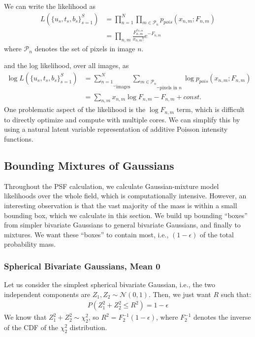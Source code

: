 \documentclass[11pt]{article}
\begin{document}
We can write the likelihood as 
\begin{align}
   L(\{u_s, t_s, b_s\}_{s=1}^S)
     &= \prod_{n=1}^N \prod_{m \in \mathcal{P}_n} p_{pois}(x_{n,m} ; F_{n,m}) \\
     &= \prod_{n,m} \frac{ F_{n,m}^{x_{n,m}}}{x_{n,m}!} e^{-F_{n,m}}
\end{align}
where $\mathcal{P}_n$ denotes the set of pixels in image $n$.  

and the log likelihood, over all images, as 
\begin{align}
  \log L(\{u_s, t_s, b_s\}_{s=1}^S) 
    &= \underbrace{\sum_{n=1}^N}_{\text{images}}
       \underbrace{\sum_{m \in \mathcal{P}_n}}_{\text{pixels in $n$}}
       \log p_{pois}(x_{n,m}; F_{n,m}) \\
    &= \sum_{n,m} x_{n,m} \log F_{n,m} - F_{n,m} + const.
\end{align}
One problematic aspect of the likelihood is the $\log F_{n,m}$ term, which is difficult to directly optimize and compute with multiple cores.  We can simplify this by using a natural latent variable representation of additive Poisson intensity functions.  

\subsection{Bounding Mixtures of Gaussians}

Throughout the PSF calculation,
we calculate Gaussian-mixture model likelihoods over the whole field, which is computationally intensive. However, an
interesting observation is that the vast majority of the mass is within a small bounding box, which
we calculate in this section.
We build up bounding ``boxes'' from simpler bivariate Gaussians to general bivariate Gaussians, and
finally to mixtures. We want these ``boxes'' to contain most, i.e., $(1 - \epsilon)$ of the total probability mass.

\subsubsection{Spherical Bivariate Gaussians, Mean 0}

Let us consider the simplest spherical bivariate Gaussian, i.e., the two independent components are $Z_1, Z_2 \sim \mathcal{N}(0, 1)$. Then, we just want $R$ such that:
\begin{align*}
P(Z_1^2 + Z_2^2 \leq R^2) = 1 - \epsilon
\end{align*}
We know that $Z_1^2 + Z_2^2 \sim \chi_2^2$, so $R^2 = F_2^{-1}(1 - \epsilon)$, where $F_2^{-1}$ denotes
the inverse of the CDF of the $\chi_2^2$ distribution.
\end{document}

